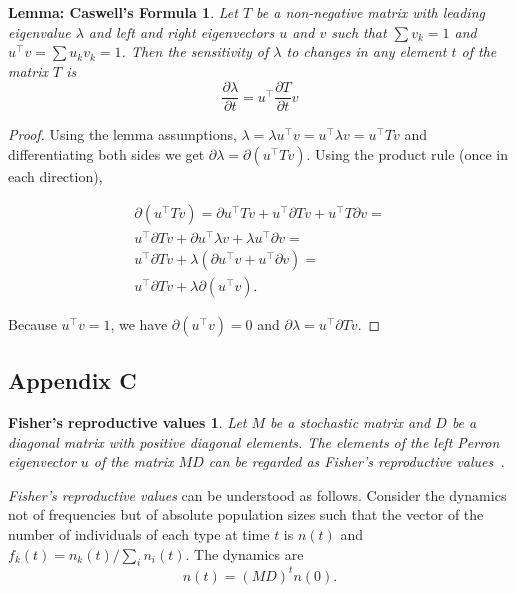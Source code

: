 \documentclass[9pt, a4paper, twocolumn]{extarticle}   	%
\newcommand*{\tr}{^\intercal}
\newtheorem*{caswell}{Lemma: Caswell's Formula}
\newtheorem*{frv}{Fisher's reproductive values}
\begin{document}
\begin{caswell}
Let $T$ be a non-negative matrix with leading eigenvalue $\lambda$ and left and right eigenvectors $u$ and $v$ such that $\sum{v_k}=1$ and $u\tr v = \sum{u_k v_k} = 1$.
Then the sensitivity of $\lambda$ to changes in any element $t$ of the matrix $T$ is
\begin{equation}\label{eq:Caswells_formula}
\frac{\partial \lambda}{\partial t} = 
u\tr \frac{\partial T}{\partial t} v
\end{equation}
\end{caswell}

\begin{proof} 
Using the lemma assumptions,
$\lambda = \lambda u\tr v = u\tr \lambda v = u\tr T v$ and differentiating both sides we get $\partial \lambda = \partial (u\tr T v)$.
Using the product rule (once in each direction),

\begin{multline}
\partial (u\tr T v) = 
\partial u\tr T v + u\tr \partial T v + u\tr T \partial v = \\
u\tr \partial T v + \partial u\tr \lambda v  + \lambda u\tr \partial v = \\
u\tr \partial T v + \lambda(\partial u\tr v  + u\tr \partial v) = \\
u\tr \partial T v + \lambda \partial(u\tr v).
\end{multline}

Because $u\tr v = 1$,
we have $\partial (u\tr v) = 0$ and
$\partial \lambda = u\tr \partial T v$.
\end{proof}

\subsection*{Appendix C}\label{sec:AppC}
\begin{frv}
Let $M$ be a stochastic matrix and $D$ be a diagonal matrix with positive diagonal elements. 
The elements of the left \emph{Perron} eigenvector $u$ of the matrix $MD$ can be regarded as \emph{Fisher's reproductive values}~\citep{Fisher1930,Grafen2006}.
\end{frv}

\emph{Fisher's reproductive values} can be understood as follows.
Consider the dynamics not of frequencies but of absolute population sizes such that the vector of the number of individuals of each type at time $t$ is $n(t)$ and $f_k(t) = n_k(t) / \sum_i{n_i(t)}$.
The dynamics are
\begin{equation}
n(t) = (MD)^t n(0).
\end{equation}
\end{document}
